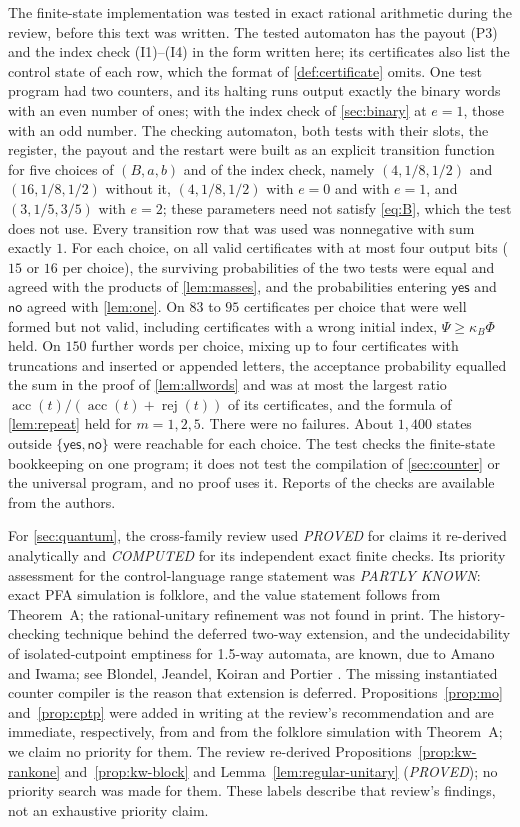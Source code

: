 \documentclass[11pt]{article}
\theoremstyle{plain}
\theoremstyle{definition}
\theoremstyle{remark}
\newcommand{\yes}{\mathsf{yes}}
\newcommand{\no}{\mathsf{no}}
\newcommand{\acc}{\operatorname{acc}}
\newcommand{\rej}{\operatorname{rej}}
\begin{document}
The finite-state implementation was tested in exact rational arithmetic during the review, before this text was written. The tested automaton has the payout (P3) and the index check (I1)--(I4) in the form written here; its certificates also list the control state of each row, which the format of \cref{def:certificate} omits. One test program had two counters, and its halting runs output exactly the binary words with an even number of ones; with the index check of \cref{sec:binary} at $e=1$, those with an odd number. The checking automaton, both tests with their slots, the register, the payout and the restart were built as an explicit transition function for five choices of $(B,a,b)$ and of the index check, namely $(4,1/8,1/2)$ and $(16,1/8,1/2)$ without it, $(4,1/8,1/2)$ with $e=0$ and with $e=1$, and $(3,1/5,3/5)$ with $e=2$; these parameters need not satisfy \eqref{eq:B}, which the test does not use. Every transition row that was used was nonnegative with sum exactly $1$. For each choice, on all valid certificates with at most four output bits ($15$ or $16$ per choice), the surviving probabilities of the two tests were equal and agreed with the products of \cref{lem:masses}, and the probabilities entering $\yes$ and $\no$ agreed with \cref{lem:one}. On $83$ to $95$ certificates per choice that were well formed but not valid, including certificates with a wrong initial index, $\Psi\ge\kappa_B\Phi$ held. On $150$ further words per choice, mixing up to four certificates with truncations and inserted or appended letters, the acceptance probability equalled the sum in the proof of \cref{lem:allwords} and was at most the largest ratio $\acc(t)/(\acc(t)+\rej(t))$ of its certificates, and the formula of \cref{lem:repeat} held for $m=1,2,5$. There were no failures. About $1{,}400$ states outside $\{\yes,\no\}$ were reachable for each choice. The test checks the finite-state bookkeeping on one program; it does not test the compilation of \cref{sec:counter} or the universal program, and no proof uses it. Reports of the checks are available from the authors.

For \cref{sec:quantum}, the cross-family review used \emph{PROVED} for claims it re-derived analytically and \emph{COMPUTED} for its independent exact finite checks. Its priority assessment for the control-language range statement was \emph{PARTLY KNOWN}: exact PFA simulation is folklore, and the value statement follows from Theorem~A; the rational-unitary refinement was not found in print. The history-checking technique behind the deferred two-way extension, and the undecidability of isolated-cutpoint emptiness for 1.5-way automata, are known, due to Amano and Iwama; see Blondel, Jeandel, Koiran and Portier \cite[p.~1464]{BJKP05}. The missing instantiated counter compiler is the reason that extension is deferred. Propositions~\ref{prop:mo} and~\ref{prop:cptp} were added in writing at the review's recommendation and are immediate, respectively, from \cite{DJK05} and from the folklore simulation \cite[Theorem~4.2]{AY15} with Theorem~A; we claim no priority for them. The review re-derived Propositions~\ref{prop:kw-rankone} and~\ref{prop:kw-block} and Lemma~\ref{lem:regular-unitary} (\emph{PROVED}); no priority search was made for them. These labels describe that review's findings, not an exhaustive priority claim.
\end{document}
